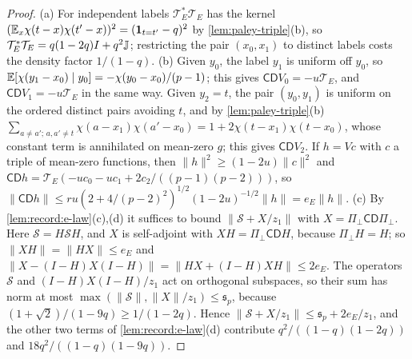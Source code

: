 \begin{proof}
(a) For independent labels $\mathcal T_E^*\mathcal T_E$ has the kernel
$(\mathbb E_x\chi(t-x)\chi(t'-x))^2=(\mathbf 1_{t=t'}-q)^2$ by \cref{lem:paley-triple}(b), so
$\mathcal T_E^*\mathcal T_E=q(1-2q)I+q^2\mathbb J$; restricting the pair $(x_0,x_1)$ to
distinct labels costs the density factor $1/(1-q)$.
(b) Given $y_0$, the label $y_1$ is uniform off $y_0$, so
$\mathbb E[\chi(y_1-x_0)\mid y_0]=-\chi(y_0-x_0)/(p-1)$; this gives
$\mathsf C\mathsf DV_0=-u\mathcal T_E$, and $\mathsf C\mathsf DV_1=-u\mathcal T_E$ in
the same way. Given $y_2=t$, the pair $(y_0,y_1)$ is uniform on the ordered
distinct pairs avoiding $t$, and by \cref{lem:paley-triple}(b)
$\sum_{a\ne a';\,a,a'\ne t}\chi(a-x_1)\chi(a'-x_0)=1+2\chi(t-x_1)\chi(t-x_0)$,
whose constant term is annihilated on mean-zero $g$; this gives
$\mathsf C\mathsf DV_2$. If $h=Vc$ with $c$ a triple of mean-zero functions, then
$\|h\|^2\ge(1-2u)\|c\|^2$ and
$\mathsf C\mathsf Dh=\mathcal T_E(-uc_0-uc_1+2c_2/((p-1)(p-2)))$, so
$\|\mathsf C\mathsf Dh\|\le ru(2+4/(p-2)^2)^{1/2}(1-2u)^{-1/2}\|h\|=e_E\|h\|$.
(c) By \cref{lem:record:e-law}(c),(d) it suffices to bound
$\|\mathcal S+X/z_1\|$ with $X=\Pi_\perp\mathsf C\mathsf D\Pi_\perp$. Here
$\mathcal S=H\mathcal SH$, and $X$ is self-adjoint with
$XH=\Pi_\perp\mathsf C\mathsf DH$, because $\Pi_\perp H=H$; so $\|XH\|=\|HX\|\le e_E$
and $\|X-(I-H)X(I-H)\|=\|HX+(I-H)XH\|\le2e_E$. The operators $\mathcal S$ and
$(I-H)X(I-H)/z_1$ act on orthogonal subspaces, so their sum has norm at most
$\max(\|\mathcal S\|,\|X\|/z_1)\le\mathfrak s_p$, because
$(1+\sqrt2)/(1-9q)\ge1/(1-2q)$. Hence $\|\mathcal S+X/z_1\|\le\mathfrak s_p+2e_E/z_1$,
and the other two terms of \cref{lem:record:e-law}(d) contribute
$q^2/((1-q)(1-2q))$ and $18q^2/((1-q)(1-9q))$.
\end{proof}

